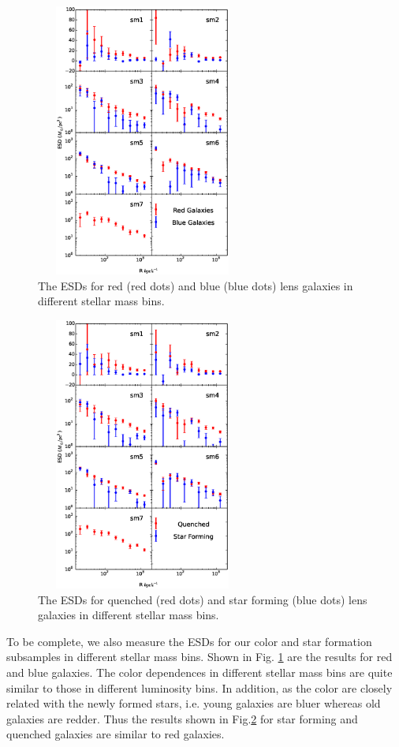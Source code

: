 \documentclass[apj]{emulateapj}
\begin{document}
\begin{figure}
\centering
\includegraphics[width=7cm,height=9cm]{f9.eps}
\caption{The ESDs for red (red dots) and blue (blue dots) lens
  galaxies in  different stellar mass bins.}
  \label{fig:sm_color}
\end{figure}

\begin{figure}
\centering
\includegraphics[width=7cm,height=9cm]{f10.eps}
\caption{The ESDs for quenched (red dots) and star forming (blue dots)
  lens galaxies in different stellar mass bins.}
  \label{fig:sm_sq}
\end{figure}




To be complete, we also measure the ESDs for our color and star
formation subsamples in different stellar mass bins. Shown in
Fig. \ref{fig:sm_color} are the results for red and blue galaxies. The
color dependences in different stellar mass bins are quite similar to
those in different luminosity bins. In addition, as the color are
closely related with the newly formed stars, i.e. young galaxies are
bluer whereas old galaxies are redder. Thus the results shown in
Fig.\ref{fig:sm_sq} for star forming and quenched galaxies are similar
to red galaxies.
\end{document}
